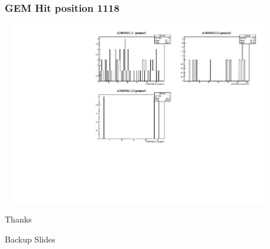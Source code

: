 \documentclass[slidestop,compress,mathserif]{beamer}
\begin{document}
\begin{frame}\frametitle{GEM Hit position 1118}
	 \includegraphics[width=12cm,height=8cm]{GEM_Hit_position_1118.pdf}
\end{frame}

\label{lastslide}
\begin{frame}[c]
	\begin{center}
	\Huge Thanks
	\end{center}
\end{frame}

\begin{frame}[c]
	\begin{center}
	\Huge Backup Slides
	\end{center}
\end{frame}
\end{document}
